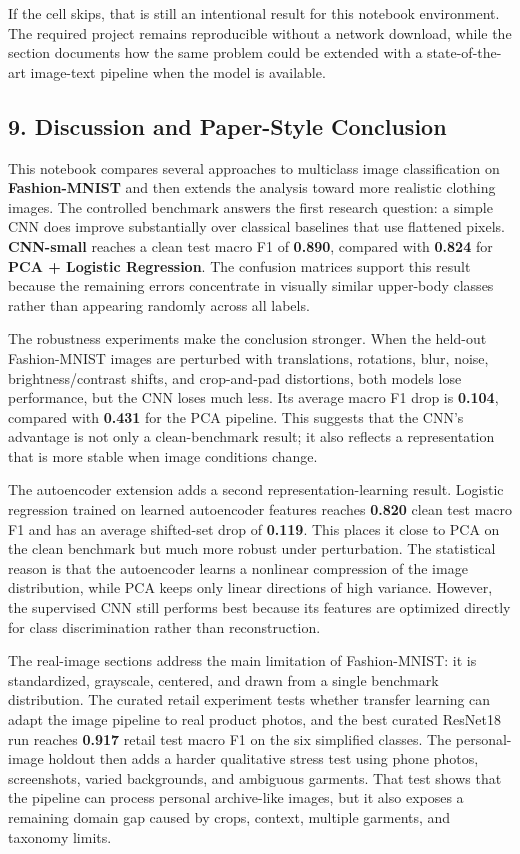\documentclass[11pt]{article}
\begin{document}
If the cell skips, that is still an intentional result for this notebook
environment. The required project remains reproducible without a network
download, while the section documents how the same problem could be
extended with a state-of-the-art image-text pipeline when the model is
available.

    \subsection{9. Discussion and Paper-Style
Conclusion}\label{discussion-and-paper-style-conclusion}

This notebook compares several approaches to multiclass image
classification on \textbf{Fashion-MNIST} and then extends the analysis
toward more realistic clothing images. The controlled benchmark answers
the first research question: a simple CNN does improve substantially
over classical baselines that use flattened pixels. \textbf{CNN-small}
reaches a clean test macro F1 of \textbf{0.890}, compared with
\textbf{0.824} for \textbf{PCA + Logistic Regression}. The confusion
matrices support this result because the remaining errors concentrate in
visually similar upper-body classes rather than appearing randomly
across all labels.

The robustness experiments make the conclusion stronger. When the
held-out Fashion-MNIST images are perturbed with translations,
rotations, blur, noise, brightness/contrast shifts, and crop-and-pad
distortions, both models lose performance, but the CNN loses much less.
Its average macro F1 drop is \textbf{0.104}, compared with
\textbf{0.431} for the PCA pipeline. This suggests that the CNN's
advantage is not only a clean-benchmark result; it also reflects a
representation that is more stable when image conditions change.

The autoencoder extension adds a second representation-learning result.
Logistic regression trained on learned autoencoder features reaches
\textbf{0.820} clean test macro F1 and has an average shifted-set drop
of \textbf{0.119}. This places it close to PCA on the clean benchmark
but much more robust under perturbation. The statistical reason is that
the autoencoder learns a nonlinear compression of the image
distribution, while PCA keeps only linear directions of high variance.
However, the supervised CNN still performs best because its features are
optimized directly for class discrimination rather than reconstruction.

The real-image sections address the main limitation of Fashion-MNIST: it
is standardized, grayscale, centered, and drawn from a single benchmark
distribution. The curated retail experiment tests whether transfer
learning can adapt the image pipeline to real product photos, and the
best curated ResNet18 run reaches \textbf{0.917} retail test macro F1 on
the six simplified classes. The personal-image holdout then adds a
harder qualitative stress test using phone photos, screenshots, varied
backgrounds, and ambiguous garments. That test shows that the pipeline
can process personal archive-like images, but it also exposes a
remaining domain gap caused by crops, context, multiple garments, and
taxonomy limits.
\end{document}
